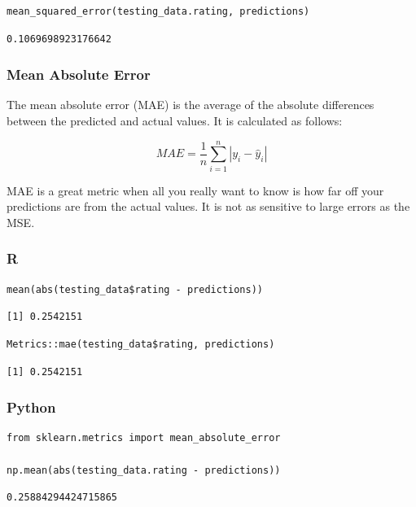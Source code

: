 \documentclass[
  letterpaper,
]{krantz}
\begin{document}
\begin{verbatim}
mean_squared_error(testing_data.rating, predictions)
\end{verbatim}

\begin{verbatim}
0.1069698923176642
\end{verbatim}

\subsubsection{Mean Absolute Error}\label{sec-knowing-metrics-mae}

The mean absolute error (MAE) is the average of the absolute differences
between the predicted and actual values. It is calculated as follows:

\[MAE = \frac{1}{n}\sum_{i=1}^{n}|y_i - \hat{y}_i|\]

MAE is a great metric when all you really want to know is how far off
your predictions are from the actual values. It is not as sensitive to
large errors as the MSE.

\subsubsection{R}

\begin{verbatim}
mean(abs(testing_data$rating - predictions))
\end{verbatim}

\begin{verbatim}
[1] 0.2542151
\end{verbatim}

\begin{verbatim}
Metrics::mae(testing_data$rating, predictions)
\end{verbatim}

\begin{verbatim}
[1] 0.2542151
\end{verbatim}

\subsubsection{Python}

\begin{verbatim}
from sklearn.metrics import mean_absolute_error

np.mean(abs(testing_data.rating - predictions))
\end{verbatim}

\begin{verbatim}
0.25884294424715865
\end{verbatim}
\end{document}
